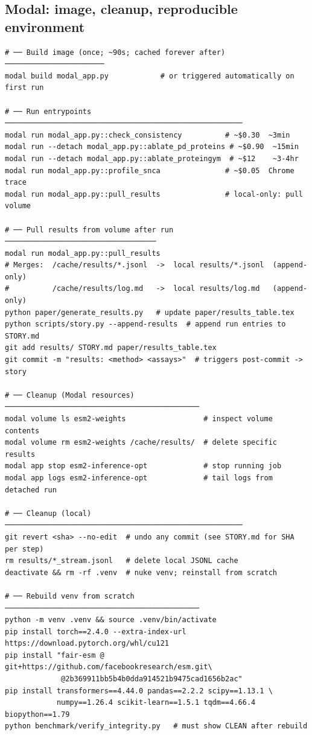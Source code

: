 \documentclass[11pt,a4paper]{article}
\begin{document}
\subsection{Modal: image, cleanup, reproducible environment}

\begin{lstlisting}[style=shell,caption={%
  Modal-specific steps. Image is built once and cached by content hash
  (\texttt{im-tPKQcOYJ2kBgvntr2EiOq7}); subsequent runs skip build entirely.
}]
# ── Build image (once; ~90s; cached forever after) ───────────────────────
modal build modal_app.py            # or triggered automatically on first run

# ── Run entrypoints ───────────────────────────────────────────────────────
modal run modal_app.py::check_consistency          # ~$0.30  ~3min
modal run --detach modal_app.py::ablate_pd_proteins # ~$0.90  ~15min
modal run --detach modal_app.py::ablate_proteingym  # ~$12    ~3-4hr
modal run modal_app.py::profile_snca               # ~$0.05  Chrome trace
modal run modal_app.py::pull_results               # local-only: pull volume

# ── Pull results from volume after run ───────────────────────────────────
modal run modal_app.py::pull_results
# Merges:  /cache/results/*.jsonl  ->  local results/*.jsonl  (append-only)
#          /cache/results/log.md   ->  local results/log.md   (append-only)
python paper/generate_results.py   # update paper/results_table.tex
python scripts/story.py --append-results  # append run entries to STORY.md
git add results/ STORY.md paper/results_table.tex
git commit -m "results: <method> <assays>"  # triggers post-commit -> story

# ── Cleanup (Modal resources) ─────────────────────────────────────────────
modal volume ls esm2-weights                  # inspect volume contents
modal volume rm esm2-weights /cache/results/  # delete specific results
modal app stop esm2-inference-opt             # stop running job
modal app logs esm2-inference-opt             # tail logs from detached run

# ── Cleanup (local) ───────────────────────────────────────────────────────
git revert <sha> --no-edit  # undo any commit (see STORY.md for SHA per step)
rm results/*_stream.jsonl   # delete local JSONL cache
deactivate && rm -rf .venv  # nuke venv; reinstall from scratch

# ── Rebuild venv from scratch ─────────────────────────────────────────────
python -m venv .venv && source .venv/bin/activate
pip install torch==2.4.0 --extra-index-url https://download.pytorch.org/whl/cu121
pip install "fair-esm @ git+https://github.com/facebookresearch/esm.git\
             @2b369911bb5b4b0dda914521b9475cad1656b2ac"
pip install transformers==4.44.0 pandas==2.2.2 scipy==1.13.1 \
            numpy==1.26.4 scikit-learn==1.5.1 tqdm==4.66.4 biopython==1.79
python benchmark/verify_integrity.py   # must show CLEAN after rebuild
\end{lstlisting}
\end{document}
